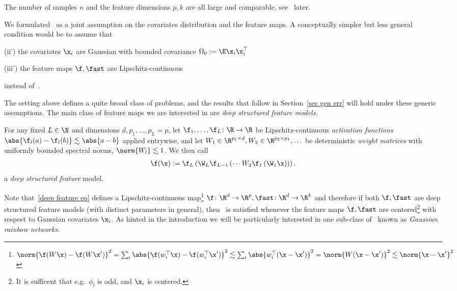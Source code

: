 \begin{assumption}\label{ass:dimensions}
    The number of samples $n$ and the feature dimensions $p,k$ are all large and comparable, see~ later.
\end{assumption}
\begin{remark}\label{remark suff cond}
    We formulated~ as a joint assumption on the covariates distribution and the feature maps. A conceptually simpler but less general condition would be to assume that
    \begin{condenum}[topsep=0pt,itemsep=-1ex,partopsep=1ex,parsep=1ex]
        \item[(ii')] the covariates $\x_i$ are Gaussian with bounded covariance $\Omega_0:=\E\x_i\x_i^\top$
        \item[(iii')] the feature maps $\f,\fast$ are Lipschitz-continuous
    \end{condenum}
    instead of~.
\end{remark}
The setting above defines a quite broad class of problems, and the results that follow in Section~\ref{sec gen err} will hold under these generic assumptions. The main class of feature maps we are interested in are \emph{deep structured feature models}.
\begin{definition}\label{deep feature model}
    For any fixed $L\in\N$ and dimensions $d,p_1,\ldots,p_L=p$, let $\f_1,\ldots,\f_L\colon\R\to\R$ be Lipschitz-continuous \emph{activation functions} $\abs{\f_l(a)-\f_l(b)}\lesssim\abs{a-b}$ applied entrywise, and let $W_1\in\R^{p_1\times d}, W_2\in\R^{p_2\times p_1},\ldots$ be deterministic \emph{weight matrices} with uniformly bounded spectral norms, $\norm{W_l}\lesssim 1$. We then call
\begin{align}\label{deep feature eq}
    \f(\x) := \f_{L}\left(\W_{L}\f_{L-1}\left(\cdots W_{2}\f_{1}\left(\W_{1}\x\right)\right)\right).
\end{align}%
a \emph{deep structured feature} model. 
\end{definition}
Note that~\cref{deep feature eq} defines a Lipschitz-continuous map\footnote{$\norm{\f(W\x)-\f(W\x')}^2 = \sum_{i} \abs{\f(w_i^\top \x)-\f(w_i^\top \x')}^2 \lesssim \sum_i \abs{w_i^\top(\x-\x')}^2 = \norm{W(\x-\x')}^2\lesssim \norm{\x-\x'}^2$} $\f\colon\R^d\to\R^{p},\fast\colon\R^d\to\R^k$ and therefore if both $\f,\fast$ are deep structured feature models (with distinct parameters in general), then~ is satisfied whenever the feature maps $\f,\fast$ are centered\footnote{It is sufficent that e.g.\ $\phi_l$ is odd, and $\x_i$ is centered.} with respect to Gaussian covariates $\x_i$. As hinted in the introduction we will be particularly interested in one sub-class of~ known as \emph{Gaussian rainbow networks}.
